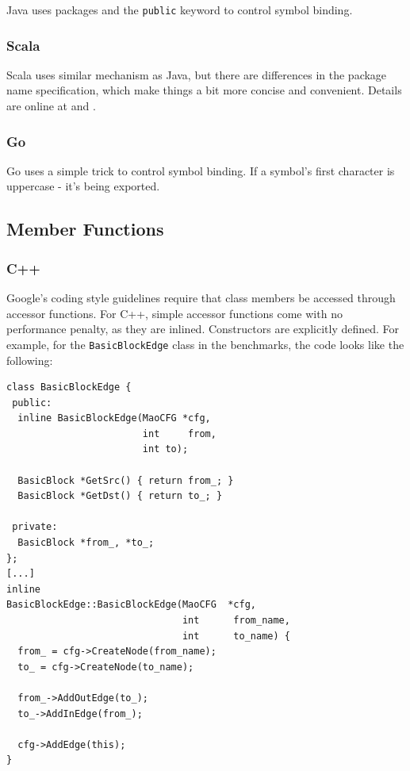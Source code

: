 Java uses packages and the {\tt public}
 keyword to control symbol binding.

\subsubsection{Scala}

Scala uses similar mechanism as Java, but there are differences in the
package name specification, which make things a bit more concise and
convenient. Details are online at \cite{scala-package-1} 
and \cite{scala-package-2}.

\subsubsection{Go}
Go uses a simple trick to control symbol binding. If a symbol's first
character is uppercase - it's being exported. 


\subsection{Member Functions}

\subsubsection{C++}

Google's coding style guidelines require that class members be
accessed through accessor functions. For C++, simple accessor
functions come with no performance penalty, as they are
inlined. Constructors are explicitly defined. For example, for
the {\tt BasicBlockEdge} class in the benchmarks, the code looks like the
following:

\begin{footnotesize}
\begin{verbatim}
class BasicBlockEdge {
 public:
  inline BasicBlockEdge(MaoCFG *cfg, 
                        int     from, 
                        int to);

  BasicBlock *GetSrc() { return from_; }
  BasicBlock *GetDst() { return to_; }

 private:
  BasicBlock *from_, *to_;
};
[...]
inline
BasicBlockEdge::BasicBlockEdge(MaoCFG  *cfg,
                               int      from_name,
                               int      to_name) {
  from_ = cfg->CreateNode(from_name);
  to_ = cfg->CreateNode(to_name);

  from_->AddOutEdge(to_);
  to_->AddInEdge(from_);

  cfg->AddEdge(this);
}
\end{verbatim}
\end{footnotesize}


